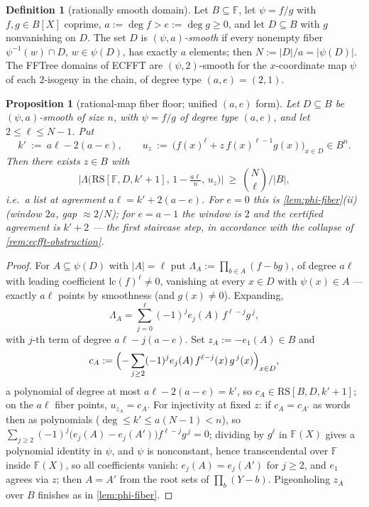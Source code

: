 \documentclass[11pt]{article}
\newtheorem{proposition}[theorem]{Proposition}
\theoremstyle{definition}
\newtheorem{definition}[theorem]{Definition}
\theoremstyle{remark}
\newcommand{\F}{\mathbb{F}}
\newcommand{\B}{B}
\newcommand{\RS}{\mathrm{RS}}
\newcommand{\Lst}{\Lambda}
\newcommand{\eone}{e_1}
\begin{document}
\begin{definition}[rationally smooth domain]\label{def:rational-smooth}
Let $\B\subseteq\F$, let $\psi=f/g$ with $f,g\in\B[X]$ coprime, $a:=\deg f>e:=\deg g\ge0$, and let $D\subseteq\B$ with $g$ nonvanishing on $D$. The set $D$ is \emph{$(\psi,a)$-smooth} if every nonempty fiber $\psi^{-1}(w)\cap D$, $w\in\psi(D)$, has exactly $a$ elements; then $N:=|D|/a=|\psi(D)|$. The FFTree domains of ECFFT \cite{BCKL21} are $(\psi,2)$-smooth for the $x$-coordinate map $\psi$ of each $2$-isogeny in the chain, of degree type $(a,e)=(2,1)$.
\end{definition}

\begin{proposition}[rational-map fiber floor; unified $(a,e)$ form]\label{prop:rational-floor}
Let $D\subseteq\B$ be $(\psi,a)$-smooth of size $n$, with $\psi=f/g$ of degree type $(a,e)$, and let $2\le\ell\le N-1$. Put
\[
k'\ :=\ a\ell-2(a-e),
\qquad
u_z\ :=\ \bigl(f(x)^{\ell}+z\,f(x)^{\ell-1}g(x)\bigr)_{x\in D}\in\B^n .
\]
Then there exists $z\in\B$ with
\[
\bigl|\Lst\bigl(\RS[\F,D,k'+1],\,1-\tfrac{a\ell}n,\,u_z\bigr)\bigr|\ \ge\ \binom N{\ell}\Big/|\B| ,
\]
i.e.\ a list at agreement $a\ell=k'+2(a-e)$. For $e=0$ this is \cref{lem:phi-fiber}\textup{(ii)} \textup(window $2a$, gap $\approx2/N$\textup); for $e=a-1$ the window is $2$ and the certified agreement is $k'+2$ --- the first staircase step, in accordance with the collapse of \cref{rem:ecfft-obstruction}.
\end{proposition}

\begin{proof}
For $A\subseteq\psi(D)$ with $|A|=\ell$ put $\Lambda_A:=\prod_{b\in A}(f-bg)$, of degree $a\ell$ with leading coefficient $\mathrm{lc}(f)^\ell\ne0$, vanishing at every $x\in D$ with $\psi(x)\in A$ --- exactly $a\ell$ points by smoothness \textup(and $g(x)\ne0$\textup). Expanding,
\[
\Lambda_A=\sum_{j=0}^{\ell}(-1)^je_j(A)\,f^{\ell-j}g^{\,j},
\]
with $j$-th term of degree $a\ell-j(a-e)$. Set $z_A:=-\eone(A)\in\B$ and
\[
c_A:=\Bigl(-\sum_{j\ge2}(-1)^je_j(A)\,f^{\ell-j}(x)\,g^{\,j}(x)\Bigr)_{x\in D},
\]
a polynomial of degree at most $a\ell-2(a-e)=k'$, so $c_A\in\RS[\B,D,k'+1]$; on the $a\ell$ fiber points, $u_{z_A}=c_A$. For injectivity at fixed $z$: if $c_A=c_{A'}$ as words then as polynomials \textup($\deg\le k'\le a(N-1)<n$\textup), so $\sum_{j\ge2}(-1)^j\bigl(e_j(A)-e_j(A')\bigr)f^{\ell-j}g^{\,j}=0$; dividing by $g^{\ell}$ in $\F(X)$ gives a polynomial identity in $\psi$, and $\psi$ is nonconstant, hence transcendental over $\F$ inside $\F(X)$, so all coefficients vanish: $e_j(A)=e_j(A')$ for $j\ge2$, and $\eone$ agrees via $z$; then $A=A'$ from the root sets of $\prod_{b}(Y-b)$. Pigeonholing $z_A$ over $\B$ finishes as in \cref{lem:phi-fiber}.
\end{proof}
\end{document}
